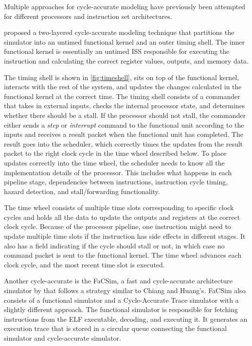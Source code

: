 Multiple approaches for cycle-accurate modeling have previously been attempted for different processors and instruction set architectures.

\textcite{chiangEfficientTwolayeredCycleaccurate2009} proposed a two-layered cycle-accurate modeling technique that partitions the simulator into an untimed functional kernel and an outer timing shell. The inner functional kernel is essentially an untimed ISS responsible for executing the instruction and calculating the correct register values, outputs, and memory data.

The timing shell is shown in \cref{fig:timeshell}, sits on top of the functional kernel, interacts with the rest of the system, and updates the changes calculated in the functional kernel at the correct time. The timing shell consists of a commander that takes in external inputs, checks the internal processor state, and determines whether there should be a stall. If the processor should not stall, the commander either sends a \textit{step} or \textit{interrupt} command to the functional unit according to the inputs and receives a result packet when the functional unit has completed. The result goes into the scheduler, which correctly times the updates from the result packet to the right clock cycle in the time wheel described below. To place updates correctly into the time wheel, the scheduler needs to know all the implementation details of the processor. This includes what happens in each pipeline stage, dependencies between instructions, instruction cycle timing, hazard detection, and stall/forwarding functionality. 

The time wheel consists of multiple time slots corresponding to specific clock cycles and holds all the data to update the outputs and registers at the correct clock cycle. Because of the processor pipeline, one instruction might need to update multiple time slots if the instruction has side effects in different stages. It also has a field indicating if the cycle should stall or not, in which case no command packet is sent to the functional kernel. The time wheel advances each clock cycle, and the most recent time slot is executed.

Another cycle-accurate is the FaCSim, a fast and cycle-accurate architecture simulator by \textcite{leeFaCSimFastCycleAccurate2008} that follows a strategy similar to Chiang and Huang's. FaCSim also consists of a functional simulator and a Cycle-Accurate Trace simulator with a slightly different approach. The functional simulator is responsible for fetching instructions from the ELF executable, decoding, and executing it. It generates an execution trace that is stored in a circular queue connecting the functional simulator and cycle-accurate simulator. 

